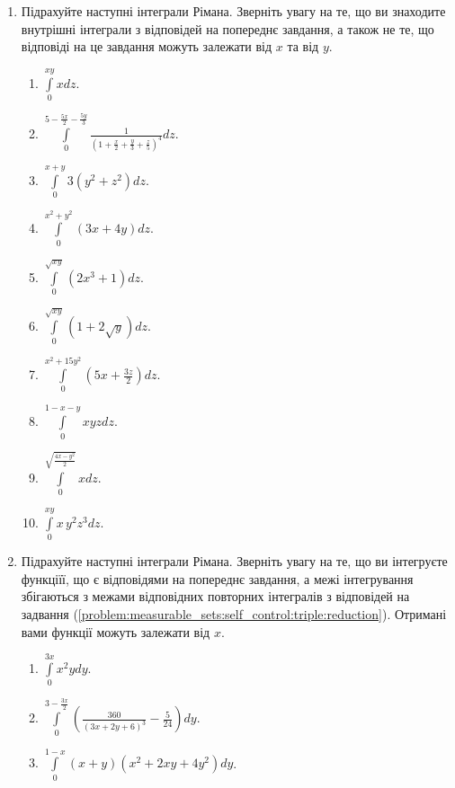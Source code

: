 \begin{enumerate}
\begin{enumerate}[label*=\arabic*.]
    \end{enumerate}
\item \label{problem:measurable_sets:self_control:triple:inner}Підрахуйте наступні інтеграли Рімана. Зверніть увагу на те, що ви знаходите внутрішні інтеграли з відповідей на попереднє завдання, а також не те, що відповіді на це завдання можуть залежати від $x$ та від $y$.
\begin{multicols}{2}
    \begin{enumerate}[label*=\arabic*.]
        \item $\int\limits_{0}^{x y}xd z$.
        \item $\int\limits_{0}^{5-\frac{5 x}{2}-\frac{5 y}{3}}\frac{1}{\left(1+\frac{x}{2}+\frac{y}{3}+\frac{z}{5}\right)^{4}}d z$.
        \item $\int\limits_{0}^{x+y}3\left(y^{2}+ z^{2}\right)d z$.
        \item $\int\limits_{0}^{ x^{2}+ y^{2}}\left(3 x+4 y\right)d z$.
        \item $\int\limits_{0}^{\sqrt{x y}}\left(2 x^{3}+1\right)d z$.
        \item $\int\limits_{0}^{\sqrt{x y}}\left(1+2 {\sqrt{y}}\right)d z$.
        \item $\int\limits_{0}^{x^{2}+15 y^{2}}\left(5 x+\frac{3 z}{2}\right)d z$.
        \item $\int\limits_{0}^{1-x-y} x y z d z$.
        \item $\int\limits_{0}^{\sqrt{\frac{4 x - y^2}{2}}}xd z$.
        \item $\int\limits_{0}^{x y}x \,y^{2} z^{3}d z$.
    \end{enumerate}
\end{multicols}
\item\label{problem:measurable_sets:self_control:triple:middle} Підрахуйте наступні інтеграли Рімана. Зверніть увагу на те, що ви інтегруєте функціїї, що є відповідями на попереднє завдання, а межі інтегрування збігаються з межами відповідних повторних інтегралів з відповідей на задвання (\ref{problem:measurable_sets:self_control:triple:reduction}). Отримані вами функції можуть залежати від $x$.
\begin{multicols}{2}
    \begin{enumerate}[label*=\arabic*.]
        \item $\int\limits_{0}^{3 x}x^{2} yd y$.
        \item $\int\limits_{0}^{3-\frac{3 x}{2}}\left(\frac{360}{\left(3 x+2 y+6\right)^{3}} - \frac{5}{24}\right)d y$.
        \item $\int\limits_{0}^{1-x} \left(x+y\right) \left(x^{2}+2 x y+4 y^{2}\right)d y$.

\end{enumerate}
\end{multicols}
\end{enumerate}

